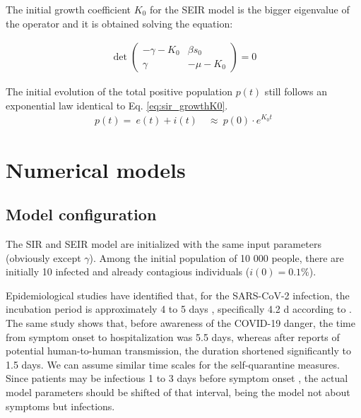 \documentclass[DIV=12, BCOR=0pt]{scrartcl}  %
\begin{document}
The initial growth coefficient $K_0$ for the SEIR model is the bigger eigenvalue of the operator and it is obtained solving the equation: 

	\begin{align}
		\det 
		\begin{pmatrix}
			- \gamma - K_0 & \beta s_0\\ %
			\gamma & - \mu - K_0  %
		\end{pmatrix} = 0
	\label{eq:seir_K0}
	\end{align}
 
 The initial evolution of the total positive population $p(t)$ still follows an exponential law identical to Eq. \ref{eq:sir_growthK0}.
 \begin{align}
		p(t) = \ e(t) + i(t) \quad \approx \  p(0) \cdot e^{K_0 t}
 \end{align}

 
	\section{Numerical models}
	\label{sec:numerical}
	
  \subsection{Model configuration}
	The SIR and SEIR model are initialized with the same input parameters (obviously except $\gamma$). Among the initial population of 10 000 people, there are initially 10 infected and already contagious individuals ($i(0) = 0.1 \%$).
	
	Epidemiological studies have identified that, for the SARS-CoV-2 infection, the incubation period is approximately 4 to 5 days \citep{Gandhi2020}, specifically 4.2 d according to \citet{Sanche2020}. The same study shows that, before awareness of the COVID-19 danger, the time from symptom onset to hospitalization was 5.5 days, whereas after reports of potential human-to-human transmission, the duration shortened significantly to 1.5 days. We can assume similar time scales for the self-quarantine measures. Since patients may be infectious 1 to 3 days before symptom onset \citep{Gandhi2020}, the actual model parameters should be shifted of that interval, being the model not about symptoms but infections. 
	
\end{document}
